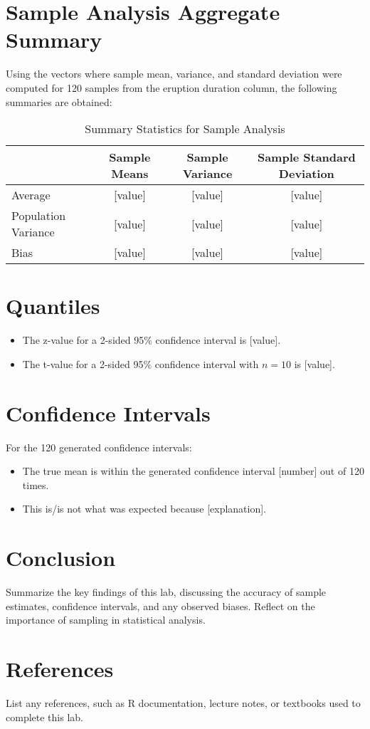 \documentclass[a4paper,12pt]{article}
\begin{document}
\section{Sample Analysis Aggregate Summary}
Using the vectors where sample mean, variance, and standard deviation were computed for 120 samples from the eruption duration column, the following summaries are obtained:

\begin{table}[h]
    \centering
    \begin{tabular}{lccc}
        \toprule
        & Sample Means & Sample Variance & Sample Standard Deviation \\
        \midrule
        Average & [value] & [value] & [value] \\
        Population Variance & [value] & [value] & [value] \\
        Bias & [value] & [value] & [value] \\
        \bottomrule
    \end{tabular}
    \caption{Summary Statistics for Sample Analysis}
\end{table}

\section{Quantiles}
\begin{itemize}
    \item The z-value for a 2-sided 95\% confidence interval is [value].
    \item The t-value for a 2-sided 95\% confidence interval with $n = 10$ is [value].
\end{itemize}

\section{Confidence Intervals}
For the 120 generated confidence intervals:

\begin{itemize}
    \item The true mean is within the generated confidence interval [number] out of 120 times.
    \item This is/is not what was expected because [explanation].
\end{itemize}

\section{Conclusion}
Summarize the key findings of this lab, discussing the accuracy of sample estimates, confidence intervals, and any observed biases. Reflect on the importance of sampling in statistical analysis.

\section{References}
List any references, such as R documentation, lecture notes, or textbooks used to complete this lab.
\end{document}
